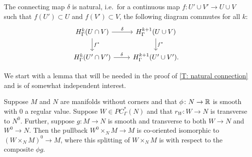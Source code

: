 \begin{comment}
	On the other hand, consider $(N^0 \times_N W) \times_N M = W^0 \times_N M \to M$.
	One again we fix $\beta_N$ and $\beta_W$ so that $\omega_{r_W} = (\beta_W,\beta_N)$.
	Again by \cref{P: codim 1 co-orient}, the co-orientation of the pullback $N^0 \times_N W \to W$ is $(\beta_{W^0},\beta_{W^0} \wedge \beta_\phi)$ for any $\beta_{W^0}$, continuing to let $\beta_\phi$ denote any normal co-orientation pulled back via $\phi$.
	If we choose $\beta_{W^0}$ so that $\beta_{W^0} \wedge \beta_\phi = \beta_W$ then we have $r_{W^0} \colon W^0 \to N$ co-oriented by $(\beta_{W^0},\beta_N)$.
	As $W^0 \subset W$, we can embed $W^0$ in $N \times \R^K$ via the composition $W^0 \into W \xhookrightarrow{e}N \times \R^K$, using the same $e$ and $K$ as above.
	As $\beta_W \wedge \beta_\nu = \beta_N \wedge \beta_E$ and $\beta_W = \beta_{W^0} \wedge \beta_\phi$, we have $\beta_{W^0} \wedge \beta_\phi \wedge \beta_\nu = \beta_N \wedge \beta_E$ so that $\beta_\phi \wedge \beta_\nu$ is the Quillen orientation for the normal bundle of $W^0$ in $N \times \R^K$.
	Using this to pull back $W^0 \to N$ to $W^0 \times_N M \to M$, by definition the pullback co-orientation is $(\beta_Q,\beta_M)$ when $\beta_Q$ and $\beta_M$ are chosen so that $\beta_Q \wedge \beta_\phi \wedge \beta_\nu = \beta_M \wedge \beta_E$.
	But this is exactly the same co-orientation we arrived at in the preceding paragraph.
	Thus the co-orientations of the two constructions agree.

	We conclude that the diagram of the lemma commutes.
\end{proof}
\end{comment}

\begin{theorem}\label{T: natural connection}
	The connecting map $\delta$ is natural, i.e.\ for a continuous map  $f \colon U' \cup V' \to U \cup V$ such that $f(U') \subset U$ and $f(V') \subset V$, the following diagram commutes for all $k$:
	\[
	\begin{tikzcd}
		H^k_\Gamma(U \cap V) \arrow[r, "\delta"] \arrow[d, "f^*"] & H^{k+1}_\Gamma(U \cup V) \arrow[d, "f^*"] \\
		H^k_\Gamma(U' \cap V') \arrow[r, "\delta"] & H^{k+1}_\Gamma(U' \cup V').
	\end{tikzcd}
	\]
\end{theorem}

We start with a lemma that will be needed in the proof of \cref{T: natural connection} and is of somewhat independent interest.

\begin{lemma}\label{L: cut pullback}
	Suppose $M$ and $N$ are manifolds without corners and that $\phi \colon N \to \mathbb{R}$ is smooth with $0$ a regular value.
	Suppose $W \in PC^*_\Gamma(N)$ and that $r_W \colon W \to N$ is transverse to $N^0$.
	Further, suppose $g \colon M \to N$ is smooth and transverse to both $W \to N$ and $W^0 \to N$.
	Then the pullback $W^0 \times_N M \to M$ is co-oriented isomorphic to $(W \times_N M)^0 \to M$, where this splitting of $W \times_N M$ is with respect to the composite $\phi g$.
\end{lemma}

